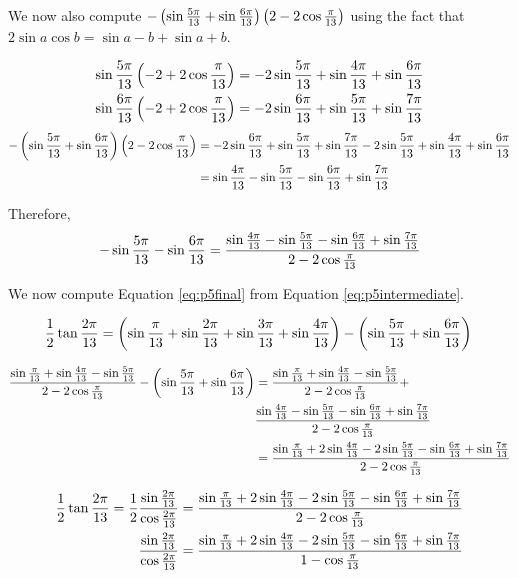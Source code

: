 \documentclass[10pt]{../usamts}
\begin{document}
\begin{solution}
We now also compute $-\left( \sin{{\frac{5\pi}{13}}} + \sin{{\frac{6\pi}{13}}} \right)\left( 2 - 2\cos{{\frac{\pi}{13}}} \right)$ using the fact that $2\sin{a}\cos{b} = \sin{a-b} + \sin{a+b}$.

\begin{align*}
    \sin{{\frac{5\pi}{13}}}\left( -2 + 2\cos{{\frac{\pi}{13}}} \right) &= -2\sin{{\frac{5\pi}{13}}} + \sin{{\frac{4\pi}{13}}} + \sin{{\frac{6\pi}{13}}} \\
    \sin{{\frac{6\pi}{13}}}\left( -2 + 2\cos{{\frac{\pi}{13}}} \right) &= -2\sin{{\frac{6\pi}{13}}} + \sin{{\frac{5\pi}{13}}} + \sin{{\frac{7\pi}{13}}}
\end{align*}
\begin{align*}
    -\left( \sin{{\frac{5\pi}{13}}} + \sin{{\frac{6\pi}{13}}} \right)\left( 2 - 2\cos{{\frac{\pi}{13}}} \right)
    &= -2\sin{{\frac{6\pi}{13}}} + \sin{{\frac{5\pi}{13}}} + \sin{{\frac{7\pi}{13}}} -2\sin{{\frac{5\pi}{13}}} + \sin{{\frac{4\pi}{13}}} + \sin{{\frac{6\pi}{13}}} \\
    &= \sin{{\frac{4\pi}{13}}} - \sin{{\frac{5\pi}{13}}} -\sin{{\frac{6\pi}{13}}} + \sin{{\frac{7\pi}{13}}}
\end{align*}

Therefore,
\[
    -\sin{{\frac{5\pi}{13}}} -\sin{{\frac{6\pi}{13}}} = \frac{\sin{{\frac{4\pi}{13}}} - \sin{{\frac{5\pi}{13}}} -\sin{{\frac{6\pi}{13}}} + \sin{{\frac{7\pi}{13}}}}{2 - 2 \cos{{\frac{\pi}{13}}}}
\]

We now compute Equation \ref{eq:p5final} from Equation \ref{eq:p5intermediate}.

\begin{equation*}
    \frac{1}{2} \tan{{\frac{2\pi}{13}}} = \left( \sin{{\frac{\pi}{13}}} + \sin{{\frac{2\pi}{13}}} + \sin{{\frac{3\pi}{13}}} + \sin{{\frac{4\pi}{13}}} \right) - \left( \sin{{\frac{5\pi}{13}}} + \sin{{\frac{6\pi}{13}}} \right) \\
\end{equation*}

\begin{align*}
    \frac{\sin{{\frac{\pi}{13}}} + \sin{{\frac{4\pi}{13}}} - \sin{{\frac{5\pi}{13}}}} {2 - 2\cos{{\frac{\pi}{13}}}}
    -\left( \sin{{\frac{5\pi}{13}}} + \sin{{\frac{6\pi}{13}}} \right)
    &= \frac{\sin{{\frac{\pi}{13}}} + \sin{{\frac{4\pi}{13}}} - \sin{{\frac{5\pi}{13}}}} {2 - 2\cos{{\frac{\pi}{13}}}} +\\
    & \frac{\sin{{\frac{4\pi}{13}}} - \sin{{\frac{5\pi}{13}}} -\sin{{\frac{6\pi}{13}}} + \sin{{\frac{7\pi}{13}}}} {2 - 2\cos{{\frac{\pi}{13}}}} \\
    &= \frac{\sin{{\frac{\pi}{13}}} + 2\sin{{\frac{4\pi}{13}}} - 2\sin{{\frac{5\pi}{13}}} - \sin{{\frac{6\pi}{13}}} + \sin{{\frac{7\pi}{13}}}} {2 - 2\cos{{\frac{\pi}{13}}}} \\
\end{align*}

\begin{align*}
     \frac{1}{2} \tan{{\frac{2\pi}{13}}} = \frac{1}{2} \frac{\sin{{\frac{2\pi}{13}}}}{\cos{{\frac{2\pi}{13}}}} &= \frac{\sin{{\frac{\pi}{13}}} + 2\sin{{\frac{4\pi}{13}}} - 2\sin{{\frac{5\pi}{13}}} - \sin{{\frac{6\pi}{13}}} + \sin{{\frac{7\pi}{13}}}} {2 - 2\cos{{\frac{\pi}{13}}}} \\
     \frac{\sin{{\frac{2\pi}{13}}}}{\cos{{\frac{2\pi}{13}}}} &= \frac{\sin{{\frac{\pi}{13}}} + 2\sin{{\frac{4\pi}{13}}} - 2\sin{{\frac{5\pi}{13}}} - \sin{{\frac{6\pi}{13}}} + \sin{{\frac{7\pi}{13}}}} {1 - \cos{{\frac{\pi}{13}}}} \\
\end{align*}


\end{solution}
\end{document}
